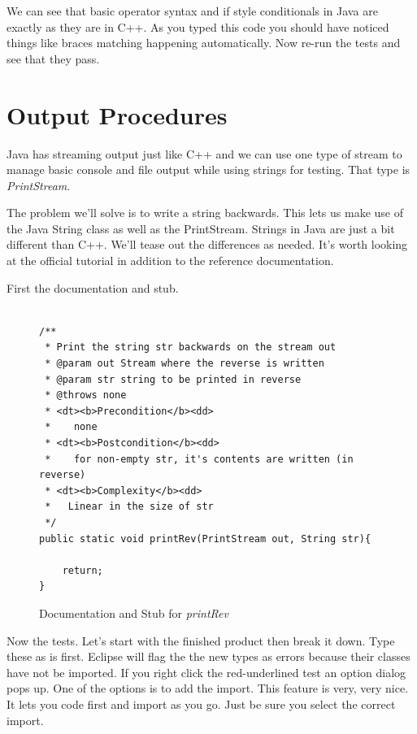 \documentclass[]{tufte-handout}
\begin{document}
We can see that basic operator syntax and if style conditionals in Java are exactly as they are in C++. As you typed this code you should have noticed things like braces matching happening automatically. Now re-run the tests and see that they pass.

\section{Output Procedures}

Java has streaming output just like C++ and we can use one type of stream to manage basic console and file output while using strings for testing. That type is \textit{PrintStream}.

The problem we'll solve is to write a string backwards. This lets us make use of the Java String class as well as the PrintStream. Strings in Java are just a bit different than C++. We'll tease out the differences as needed. It's worth looking at the official tutorial in addition to the reference documentation.

First the documentation and stub.

\begin{figure}
\begin{lstlisting}

/**
 * Print the string str backwards on the stream out
 * @param out Stream where the reverse is written
 * @param str string to be printed in reverse
 * @throws none
 * <dt><b>Precondition</b><dd>
 *    none
 * <dt><b>Postcondition</b><dd>
 *    for non-empty str, it's contents are written (in reverse)
 * <dt><b>Complexity</b><dd>
 *   Linear in the size of str
 */
public static void printRev(PrintStream out, String str){

	return;
}

\end{lstlisting}
\label{fig:printrevdox}
\caption{Documentation and Stub for \textit{printRev}}
\end{figure}

Now the tests. Let's start with the finished product then break it down. Type these as is first. Eclipse will flag the the new types as errors because their classes have not be imported. If you right click the red-underlined test an option dialog pops up. One of the options is to add the import. This feature is very, very nice. It lets you code first and import as you go. Just be sure you select the correct import.
\end{document}
